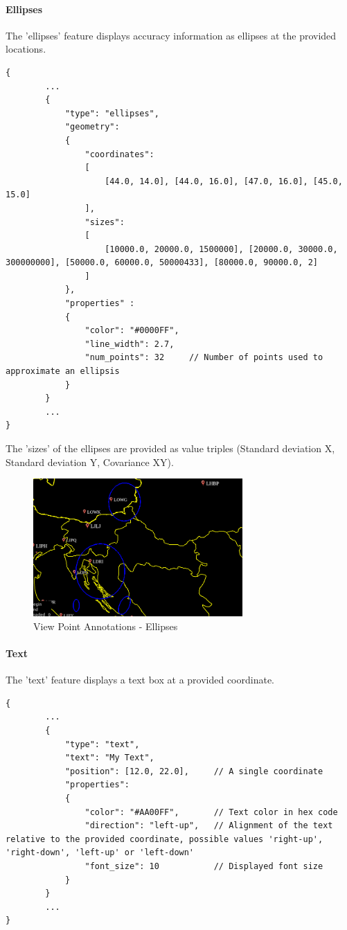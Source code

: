 \paragraph{Ellipses} The 'ellipses' feature displays accuracy information as ellipses at the provided locations.

\begin{lstlisting}[basicstyle=\small\ttfamily]
{
        ...
        {
            "type": "ellipses",
            "geometry":
            {
                "coordinates": 
                [
                    [44.0, 14.0], [44.0, 16.0], [47.0, 16.0], [45.0, 15.0]
                ],
                "sizes": 
                [
                    [10000.0, 20000.0, 1500000], [20000.0, 30000.0, 300000000], [50000.0, 60000.0, 50000433], [80000.0, 90000.0, 2]
                ]
            },
            "properties" :
            {
                "color": "#0000FF",
                "line_width": 2.7,
                "num_points": 32     // Number of points used to approximate an ellipsis
            }
        }
        ...
}
\end{lstlisting}

The 'sizes' of the ellipses are provided as value triples (Standard deviation X, Standard deviation Y, Covariance XY).

\begin{figure}[H]
    \center
        \includegraphics[width=8cm]{figures/viewpoints_anno_example_ellipses.png}
    \caption{View Point Annotations - Ellipses} 
\end{figure}

\paragraph{Text} The 'text' feature displays a text box at a provided coordinate.

\begin{lstlisting}[basicstyle=\small\ttfamily]
{
        ...
        {
            "type": "text",
            "text": "My Text",
            "position": [12.0, 22.0],     // A single coordinate
            "properties":
            {
                "color": "#AA00FF",       // Text color in hex code
                "direction": "left-up",   // Alignment of the text relative to the provided coordinate, possible values 'right-up', 'right-down', 'left-up' or 'left-down'
                "font_size": 10           // Displayed font size
            }    
        }
        ...
}
\end{lstlisting}

